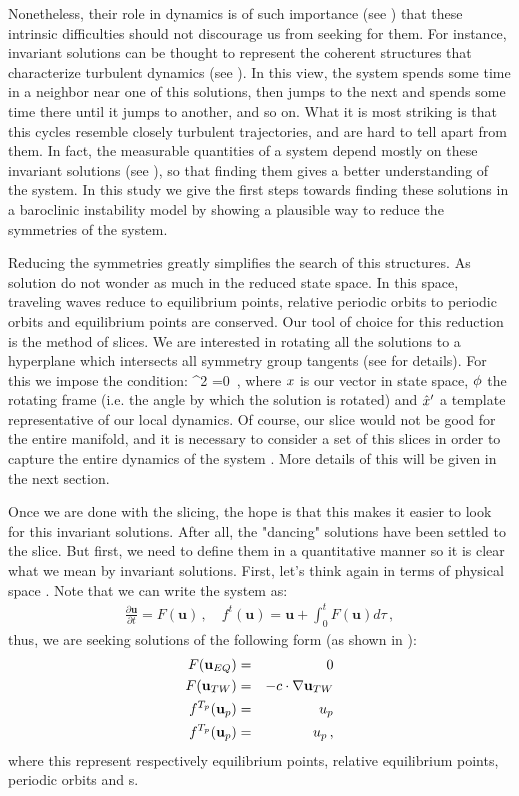 Nonetheless, their role in dynamics is of such importance (see
) that these intrinsic difficulties should not
discourage us from seeking for them. For instance, invariant solutions can be thought to represent
the coherent structures that characterize turbulent dynamics (see
). In this view, the system spends some
time in a neighbor near one of this solutions, then jumps to the next and
spends some time there until it jumps to another, and so on. What it is
most striking is that this cycles resemble closely turbulent
trajectories, and are hard to tell apart from them. In fact, the
measurable quantities of a system depend mostly on these invariant
solutions (see ), so that finding them gives a better
understanding of the system. In this study we give the first steps towards
finding these solutions in a baroclinic instability model by showing a plausible way to reduce the symmetries of the system.

Reducing the symmetries greatly simplifies the search of this structures. As solution do not
wonder as much in the reduced state space. In this space, traveling waves
reduce to equilibrium points, relative periodic orbits to periodic orbits and equilibrium points
are conserved. Our tool of choice for this reduction is the method of slices. We are interested
in rotating all the solutions to a hyperplane which intersects all symmetry group tangents (see  for details). For
this we impose the condition:
\beq
\frac{\partial}{\partial \gSpace} \norm{\ssp-\LieEl\slicep}^2 =0
\,,
where $\ssp$ is our vector in state space, $\gSpace$ the rotating frame
(i.e. the angle by which the solution is rotated) and $\slicep$ a
template representative of our local dynamics. Of course, our slice would
not be good for the entire manifold, and it is necessary to consider a
set of this slices in order to capture the entire dynamics of the system
. More details of this will be given in the next section.

Once we are done with the slicing, the hope is that this makes it easier
to look for this invariant solutions. After all, the "dancing" solutions
have been settled to the slice. But first, we need to define them in a
quantitative manner so it is clear what we mean by invariant solutions.
First, let's think again in terms of physical space . Note
that we can write the system as:
\begin{eqnarray}
\frac{\partial \textbf{u}}{\partial t}
=F(\textbf{u})
    \,,\quad
f^{t}(\textbf{u})=\textbf{u}+\int_{0}^{t}{F(\textbf{u}) d \tau}
\,,
\label{NS4}
\end{eqnarray}
thus, we are seeking solutions of the following form (as shown in ):
\begin{eqnarray}
F(\textbf{u}_{EQ}) &=& 0 \nonumber \\ 
F(\textbf{u}_{TW}) &=& -c \cdot \nabla \textbf{u}_{TW} \nonumber \\ 
f^{T_p}(\textbf{u}_{p}) &=& u_p \nonumber \\ 
f^{T_p}(\textbf{u}_{p}) &=& u_p
\,,
\label{NS_Solutions}
\end{eqnarray}
where this represent respectively equilibrium points, relative
equilibrium points, periodic orbits and \rpo s.

